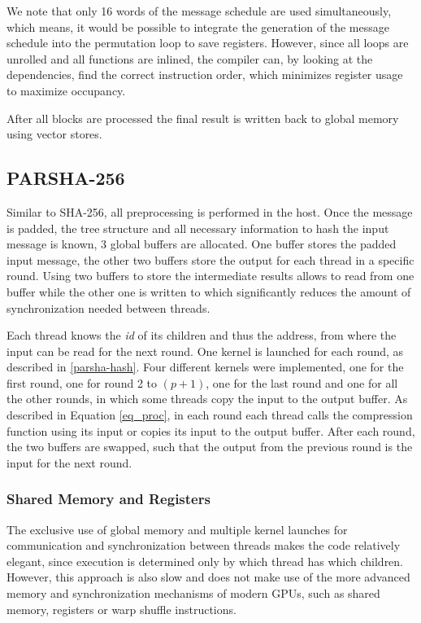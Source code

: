 \documentclass[letterpaper]{article}
\begin{document}
We note that only 16 words of the message schedule are used simultaneously, which means, it would be possible to integrate the generation of the message schedule into the permutation loop to save registers. However, since all loops are unrolled and all functions are inlined, the compiler can, by looking at the dependencies, find the correct instruction order, which minimizes register usage to maximize occupancy. 

After all blocks are processed the final result is written back to global memory using vector stores.

\subsection{PARSHA-256}
Similar to SHA-256, all preprocessing is performed in the host. Once the message is padded, the tree structure and all necessary information to hash the input message is known, 3 global buffers are allocated. One buffer stores the padded input message, the other two buffers store the output for each thread in a specific round. Using two buffers to store the intermediate results allows to read from one buffer while the other one is written to which significantly reduces the amount of synchronization needed between threads.

Each thread knows the \emph{id} of its children and thus the address, from where the input can be read for the next round. One kernel is launched for each round, as described in \ref{parsha-hash}. Four different kernels were implemented, one for the first round, one for round 2 to $(p+1)$, one for the last round and one for all the other rounds, in which some threads copy the input to the output buffer. As described in Equation \ref{eq_proc},  in each round each thread calls the compression function using its input or copies its input to the output buffer. After each round, the two buffers are swapped, such that the output from the previous round is the input for the next round. 

\subsubsection{Shared Memory and Registers}\label{optimzations}
The exclusive use of global memory and multiple kernel launches for communication and synchronization between threads makes the code relatively elegant, since execution is determined only by which thread has which children. However, this approach is also slow and does not make use of the more advanced memory and synchronization mechanisms of modern GPUs, such as shared memory, registers or warp shuffle instructions.
\end{document}
